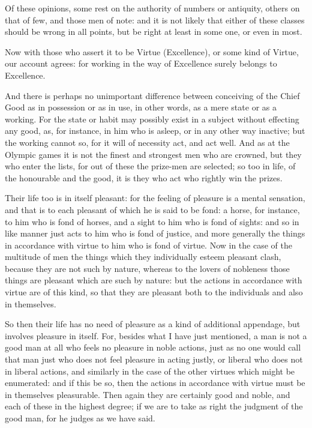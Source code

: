Of these opinions, some rest on the authority of numbers or antiquity,
others on that of few, and those men of note: and it is not likely that
either of these classes should be wrong in all points, but be right at
least in some one, or even in most.

Now with those who assert it to be Virtue (Excellence), or some kind of
Virtue, our account agrees: for working in the way of Excellence surely
belongs to Excellence.

And there is perhaps no unimportant difference between conceiving of
the Chief Good as in possession or as in use, in other words, as a mere
state or as a working. For the state or habit may possibly exist in a
subject without effecting any good, as, for instance, in him who is
asleep, or in any other way inactive; but the working cannot so, for it
will of necessity act, and act well. And as at the Olympic games it is
not the finest and strongest men who are crowned, but they who enter the
lists, for out of these the prize-men are selected; so too in life, of
the honourable and the good, it is they who act who rightly win the
prizes.

Their life too is in itself pleasant: for the feeling of pleasure is a
mental sensation, and that is to each pleasant of which he is said to be
fond: a horse, for instance, to him who is fond of horses, and a sight
to him who is fond of sights: and so in like manner just acts to him who
is fond of justice, and more generally the things in accordance with
virtue to him who is fond of virtue. Now in the case of the multitude of
men the things which they individually esteem pleasant clash, because
they are not such by nature, whereas to the lovers of nobleness those
things are pleasant which are such by nature: but the actions in
accordance with virtue are of this kind, so that they are pleasant both
to the individuals and also in themselves.

So then their life has no need of pleasure as a kind of additional
appendage, but involves pleasure in itself. For, besides what I have
just mentioned, a man is not a good man at all who feels no pleasure in
noble actions, just as no one would call that man just who does not feel
pleasure in acting justly, or liberal who does not in liberal actions,
and similarly in the case of the other virtues which might be
enumerated: and if this be so, then the actions in accordance with
virtue must be in themselves pleasurable. Then again they are certainly
good and noble, and each of these in the highest degree; if we are to
take as right the judgment of the good man, for he judges as we have
said.

